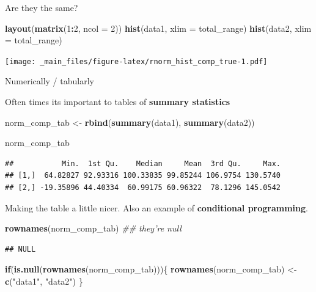 \documentclass[
]{book}
\newenvironment{Shaded}{\begin{snugshade}}{\end{snugshade}}
\newcommand{\CommentTok}[1]{\textcolor[rgb]{0.56,0.35,0.01}{\textit{#1}}}
\newcommand{\ControlFlowTok}[1]{\textcolor[rgb]{0.13,0.29,0.53}{\textbf{#1}}}
\newcommand{\DataTypeTok}[1]{\textcolor[rgb]{0.13,0.29,0.53}{#1}}
\newcommand{\DecValTok}[1]{\textcolor[rgb]{0.00,0.00,0.81}{#1}}
\newcommand{\KeywordTok}[1]{\textcolor[rgb]{0.13,0.29,0.53}{\textbf{#1}}}
\newcommand{\NormalTok}[1]{#1}
\newcommand{\OperatorTok}[1]{\textcolor[rgb]{0.81,0.36,0.00}{\textbf{#1}}}
\newcommand{\StringTok}[1]{\textcolor[rgb]{0.31,0.60,0.02}{#1}}
\begin{document}
Are they the same?

\begin{Shaded}
\begin{Highlighting}[]
\KeywordTok{layout}\NormalTok{(}\KeywordTok{matrix}\NormalTok{(}\DecValTok{1}\OperatorTok{:}\DecValTok{2}\NormalTok{, }\DataTypeTok{ncol =} \DecValTok{2}\NormalTok{))}
\KeywordTok{hist}\NormalTok{(data1, }\DataTypeTok{xlim =}\NormalTok{ total_range)}
\KeywordTok{hist}\NormalTok{(data2, }\DataTypeTok{xlim =}\NormalTok{ total_range)}
\end{Highlighting}
\end{Shaded}

\texttt{[image: \_main\_files/figure-latex/rnorm\_hist\_comp\_true-1.pdf]}

Numerically / tabularly

Often times its important to tables of \textbf{summary statistics}

\begin{Shaded}
\begin{Highlighting}[]
\NormalTok{norm_comp_tab <-}\StringTok{ }\KeywordTok{rbind}\NormalTok{(}\KeywordTok{summary}\NormalTok{(data1),}
                       \KeywordTok{summary}\NormalTok{(data2))}

\NormalTok{norm_comp_tab}
\end{Highlighting}
\end{Shaded}

\begin{verbatim}
##           Min.  1st Qu.    Median     Mean  3rd Qu.     Max.
## [1,]  64.82827 92.93316 100.33835 99.85244 106.9754 130.5740
## [2,] -19.35896 44.40334  60.99175 60.96322  78.1296 145.0542
\end{verbatim}

Making the table a little nicer. Also an example of \textbf{conditional programming}.

\begin{Shaded}
\begin{Highlighting}[]
\KeywordTok{rownames}\NormalTok{(norm_comp_tab) }\CommentTok{## they're null}
\end{Highlighting}
\end{Shaded}

\begin{verbatim}
## NULL
\end{verbatim}

\begin{Shaded}
\begin{Highlighting}[]
\ControlFlowTok{if}\NormalTok{(}\KeywordTok{is.null}\NormalTok{(}\KeywordTok{rownames}\NormalTok{(norm_comp_tab)))\{}
  \KeywordTok{rownames}\NormalTok{(norm_comp_tab) <-}\StringTok{ }\KeywordTok{c}\NormalTok{(}\StringTok{"data1"}\NormalTok{, }\StringTok{"data2"}\NormalTok{)}
\NormalTok{\}}
\end{Highlighting}
\end{Shaded}
\end{document}
